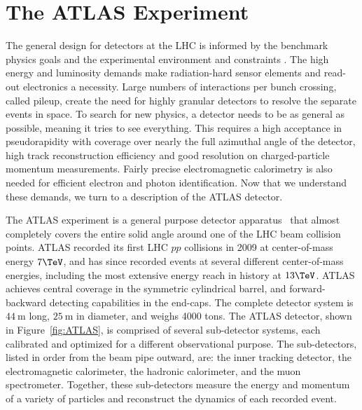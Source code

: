 \section{The ATLAS Experiment}
\label{sec:ATLAS}
The general design for detectors at the LHC is informed by the benchmark physics goals and the experimental environment and constraints \cite{tdr}.  The high energy and luminosity demands make radiation-hard sensor elements and read-out electronics a necessity.  Large numbers of interactions per bunch crossing, called pileup, create the need for highly granular detectors to resolve the separate events in space.  To search for new physics, a detector needs to be as general as possible, meaning it tries to see everything.  This requires a high acceptance in pseudorapidity with coverage over nearly the full azimuthal angle of the detector, high track reconstruction efficiency and good resolution on charged-particle momentum measurements.  Fairly precise electromagnetic calorimetry is also needed for efficient electron and photon identification.  Now that we understand these demands, we turn to a description of the ATLAS detector. 

The ATLAS experiment is a general purpose detector apparatus~\cite{Aad:2008zzm} that almost completely covers the entire solid angle around one of the LHC beam collision points.  ATLAS recorded its first LHC $pp$ collisions in 2009 at center-of-mass energy $7\TeV$, and has since recorded events at several different center-of-mass energies, including the most extensive energy reach in history at $13\TeV$.  %
ATLAS achieves central coverage in the symmetric cylindrical barrel, and forward-backward detecting capabilities in the end-caps.  The complete detector system is $44~\mathrm{m}$ long, $25~\mathrm{m}$ in diameter, and weighs 4000 tons.  The ATLAS detector, shown in Figure~\ref{fig:ATLAS}, is comprised of several sub-detector systems, each calibrated and optimized for a different observational purpose.  The sub-detectors, listed in order from the beam pipe outward, are: the inner tracking detector, the electromagnetic calorimeter, the hadronic calorimeter, and the muon spectrometer.  Together, these sub-detectors measure the energy and momentum of a variety of particles and reconstruct the dynamics of each recorded event.  

